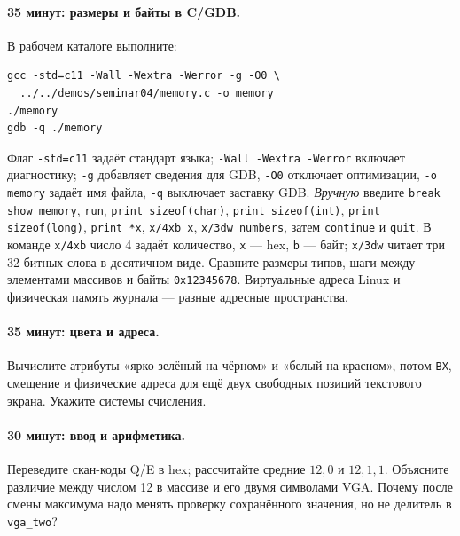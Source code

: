 \paragraph{35 минут: размеры и байты в C/GDB.}
В рабочем каталоге выполните:
\begin{lstlisting}[basicstyle=\ttfamily\footnotesize]
gcc -std=c11 -Wall -Wextra -Werror -g -O0 \
  ../../demos/seminar04/memory.c -o memory
./memory
gdb -q ./memory
\end{lstlisting}
Флаг \texttt{-std=c11} задаёт стандарт языка;
\texttt{-Wall -Wextra -Werror} включает диагностику;
\texttt{-g} добавляет сведения для GDB, \texttt{-O0} отключает
оптимизации, \texttt{-o memory} задаёт имя файла,
\texttt{-q} выключает заставку GDB. \emph{Вручную} введите
\texttt{break show\_memory}, \texttt{run},
\texttt{print sizeof(char)}, \texttt{print sizeof(int)},
\texttt{print sizeof(long)}, \texttt{print *x},
\texttt{x/4xb x}, \texttt{x/3dw numbers}, затем
\texttt{continue} и \texttt{quit}. В команде \texttt{x/4xb}
число 4 задаёт количество, \texttt{x} --- hex, \texttt{b} --- байт;
\texttt{x/3dw} читает три 32-битных слова в десятичном виде.
Сравните размеры типов, шаги между элементами массивов и байты
\texttt{0x12345678}. Виртуальные адреса Linux и физическая память
журнала --- разные адресные пространства.

\paragraph{35 минут: цвета и адреса.}
Вычислите атрибуты «ярко-зелёный на чёрном» и «белый на красном»,
потом \texttt{BX}, смещение и физические адреса для ещё двух
свободных позиций текстового экрана. Укажите системы счисления.

\paragraph{30 минут: ввод и арифметика.}
Переведите скан-коды Q/E в hex; рассчитайте средние $12,0$ и
$12,1,1$. Объясните различие между числом 12 в массиве и его
двумя символами VGA. Почему после смены максимума надо менять
проверку сохранённого значения, но не делитель в \texttt{vga\_two}?

